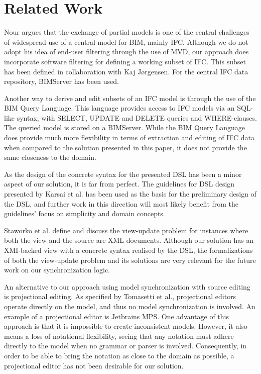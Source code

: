 \section{Related Work}
Nour argues that the exchange of partial models is one of the central challenges of widespread use of a central model for BIM, mainly IFC\cite{nour08}. Although we do not adopt his idea of end-user filtering through the use of MVD, our approach does incorporate software filtering for defining a working subset of IFC. This subset has been defined in collaboration with Kaj J\o rgensen. For the central IFC data repository, BIMServer has been used\cite{beetz10}.

Another way to derive and edit subsets of an IFC model is through the use of the BIM Query Language\cite{mazairac10}. This language provides access to IFC models via an SQL-like syntax, with SELECT, UPDATE and DELETE queries and WHERE-clauses. The queried model is stored on a BIMServer. While the BIM Query Language does provide much more flexibility in terms of extraction and editing of IFC data when compared to the solution presented in this paper, it does not provide the same closeness to the domain.

As the design of the concrete syntax for the presented DSL has been a minor aspect of our solution, it is far from perfect. The guidelines for DSL design presented by Karsai et al. \cite{karsai09} has been used as the basis for the preliminary design of the DSL, and further work in this direction will most likely benefit from the guidelines' focus on simplicity and domain concepts.

Staworko et al.\cite{staworko10} define and discuss the view-update problem for instances where both the view and the source are XML documents. Although our solution has an XMI-backed view with a concrete syntax realised by the DSL, the formalizations of both the view-update problem and its solutions are very relevant for the future work on our synchronization logic.


An alternative to our approach using model synchronization with source editing is projectional editing. As specified by Tomasetti et al.\cite{tomasetti11}, projectional editors operate directly on the model, and thus no model synchronization is involved. An example of a projectional editor is Jetbrains MPS\cite{jetbrainsmps}. One advantage of this approach is that it is impossible to create inconsistent models. However, it also means a loss of notational flexibility, seeing that any notation must adhere directly to the model when no grammar or parser is involved\cite{conf/models/Voelter10}. Consequently, in order to be able to bring the notation as close to the domain as possible, a projectional editor has not been desirable for our solution.

